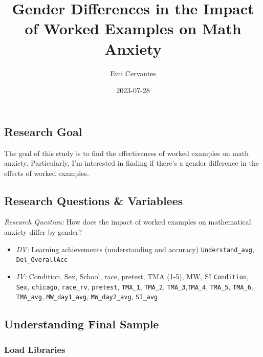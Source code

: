 \documentclass[
  letterpaper,
  DIV=11,
  numbers=noendperiod]{scrartcl}
\title{Gender Differences in the Impact of Worked Examples on Math
Anxiety}
\author{Emi Cervantes}
\date{2023-07-28}
\providecommand{\tightlist}{%
  \setlength{\itemsep}{0pt}\setlength{\parskip}{0pt}}\usepackage{longtable,booktabs,array}
\renewcommand*\contentsname{Table of contents}
\newcommand\contentsname{Table of contents}
\begin{document}
\maketitle
\renewcommand*\contentsname{Table of contents}
{
\hypersetup{linkcolor=}
\setcounter{tocdepth}{3}
\tableofcontents
}
\hypertarget{research-goal}{%
\subsection{Research Goal}\label{research-goal}}

The goal of this study is to find the effectiveness of worked examples
on math anxiety. Particularly, I'm interested in finding if there's a
gender difference in the effects of worked examples.

\hypertarget{research-questions-variablees}{%
\subsection{Research Questions \&
Variablees}\label{research-questions-variablees}}

\emph{Research Question:} How does the impact of worked examples on
mathematical anxiety differ by gender?

\begin{itemize}
\tightlist
\item
  \emph{DV:} Learning achievements (understanding and accuracy)
  \texttt{Understand\_avg}, \texttt{Del\_OverallAcc}
\item
  \emph{IV:} Condition, Sex, School, race, pretest, TMA (1-5), MW, SI
  \texttt{Condition}, \texttt{Sex}, \texttt{chicago}, \texttt{race\_rv},
  \texttt{pretest}, \texttt{TMA\_1}, \texttt{TMA\_2},
  \texttt{TMA\_3},\texttt{TMA\_4}, \texttt{TMA\_5}, \texttt{TMA\_6},
  \texttt{TMA\_avg}, \texttt{MW\_day1\_avg}, \texttt{MW\_day2\_avg},
  \texttt{SI\_avg}
\end{itemize}

\hypertarget{understanding-final-sample}{%
\subsection{Understanding Final
Sample}\label{understanding-final-sample}}

\hypertarget{load-libraries}{%
\subsubsection{Load Libraries}\label{load-libraries}}
\end{document}
